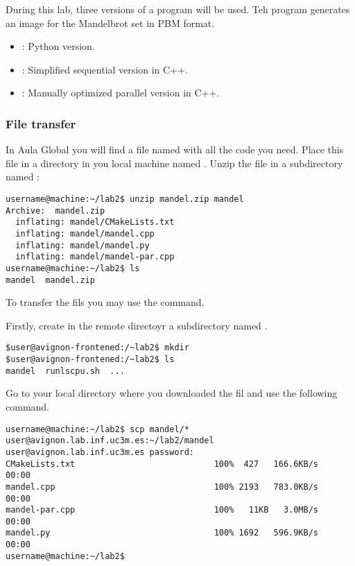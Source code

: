 During this lab, three versions of a program will be used.
Teh program generates an image for the Mandelbrot set in PBM format.

\begin{itemize}
  \item {}: Python version.
  \item {}: Simplified sequential version in C++.
  \item {}: Manually optimized parallel version in C++.
\end{itemize}

\subsubsection{File transfer}

In Aula Global you will find a file named  with all the code you need.
Place this file in a directory in you local machine named .
Unzip the file in a subdirectory named :

\begin{lstlisting}[style=terminal]
username@machine:~/lab2$ unzip mandel.zip mandel
Archive:  mandel.zip
  inflating: mandel/CMakeLists.txt   
  inflating: mandel/mandel.cpp       
  inflating: mandel/mandel.py        
  inflating: mandel/mandel-par.cpp   
username@machine:~/lab2$ ls
mandel  mandel.zip
\end{lstlisting}

To transfer the fils you may use the  command.

Firstly, create in the remote directoyr a subdirectory named .

\begin{lstlisting}[style=terminal]
$user@avignon-frontened:/~lab2$ mkdir
$user@avignon-frontened:/~lab2$ ls
mandel  runlscpu.sh  ...
\end{lstlisting}

Go to your local directory where you downloaded the  fil and 
use the following command.

\begin{lstlisting}[style=terminal,basicstyle=\tiny\ttfamily,columns=fixed]
username@machine:~/lab2$ scp mandel/* user@avignon.lab.inf.uc3m.es:~/lab2/mandel
user@avignon.lab.inf.uc3m.es password: 
CMakeLists.txt                            100%  427   166.6KB/s   00:00    
mandel.cpp                                100% 2193   783.0KB/s   00:00    
mandel-par.cpp                            100%   11KB   3.0MB/s   00:00    
mandel.py                                 100% 1692   596.9KB/s   00:00    
username@machine:~/lab2$ 
\end{lstlisting}

